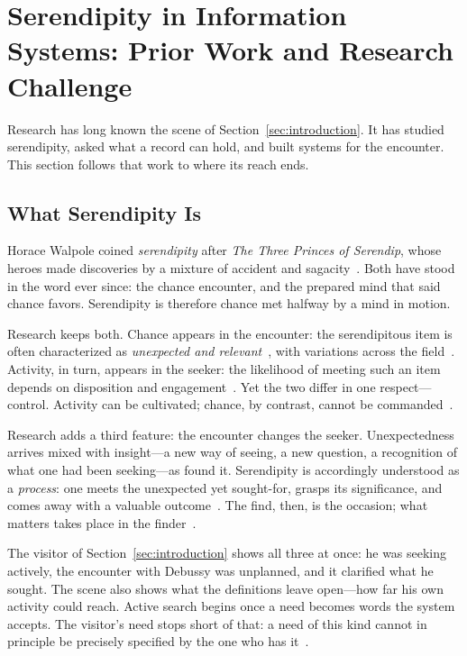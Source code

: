 \section{Serendipity in Information Systems: Prior Work and Research
  Challenge}\label{sec:serendipity}

Research has long known the scene of Section~\ref{sec:introduction}. It has
studied serendipity, asked what a record can hold, and built systems for the
encounter. This section follows that work to where its reach ends.

\subsection{What Serendipity Is}\label{subsec:serendipity_process}

Horace Walpole coined \textit{serendipity} after \textit{The Three Princes of
  Serendip}, whose heroes made discoveries by a mixture of accident and
sagacity~\citep{Armeno1557,Walpole1754}. Both have stood in
the word ever since: the chance encounter, and the prepared mind that
\citet{Pasteur1854} said chance favors. Serendipity is therefore chance met
halfway by a mind in motion.

Research keeps both. Chance appears in the encounter: the serendipitous item is
often characterized as \textit{unexpected and relevant}~\citep{Kotkov2016180},
with variations across the field~\citep{Ziarani2021375,Hasan2023933}. Activity,
in turn, appears in the seeker: the likelihood of meeting such an item depends
on disposition and engagement~\citep{Foster2003321,Erdelez199926,Makri20142179}.
Yet the two differ in one respect---control. Activity can be cultivated;
chance, by contrast, cannot be commanded~\citep{McBirnie2008600}.

Research adds a third feature: the encounter changes the seeker. Unexpectedness
arrives mixed with insight---a new way of seeing, a new question, a recognition
of what one had been seeking---as \citet{Makri2012684} found it. Serendipity
is accordingly understood as a \emph{process}: one meets the unexpected yet
sought-for, grasps its significance, and comes away with a valuable
outcome~\citep{McCayPeet20151463,Busch20241110}. The find, then, is
the occasion; what matters takes place in the finder~\citep{Merton1948505}.

The visitor of Section~\ref{sec:introduction} shows all three at once: he was
seeking actively, the encounter with Debussy was unplanned, and it clarified
what he sought. The scene also shows what the definitions leave open---how far
his own activity could reach. Active search begins once a need becomes words the
system accepts. The visitor's need stops short of that: a need of this kind
cannot in principle be precisely specified by the one who has
it~\citep{Belkin198261}.

